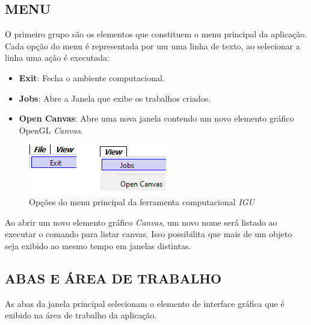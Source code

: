 \subsection{MENU}\label{sec:menu}

O primeiro grupo são os elementos que constituem o menu principal da aplicação. Cada opção do menu é representada por um uma linha de texto, ao selecionar a linha uma ação é executada:

\begin{itemize}
	\item \textbf{Exit}: Fecha o ambiente computacional.
	\item \textbf{Jobs}: Abre a Janela que exibe os trabalhos criados.
	\item \textbf{Open Canvas}: Abre uma nova janela contendo um novo elemento gráfico OpenGL \textit{Canvas}.
\end{itemize}

\begin{figure}[!htbp]
	\centering
	\includegraphics[scale=1]{Figures/IGU_016.png}
	\caption{Opções do menu principal da ferramenta computacional \textit{IGU}}
	\label{fig:menu}
\end{figure}

Ao abrir um novo elemento gráfico \textit{Canvas}, um novo nome será listado ao executar o comando para listar canvas. Isso possibilita que mais de um objeto seja exibido ao mesmo tempo em janelas distintas.

\subsection{ABAS E ÁREA DE TRABALHO}\label{sec:abas}

As abas da janela principal selecionam o elemento de interface gráfica que é exibido na área de trabalho da aplicação.

